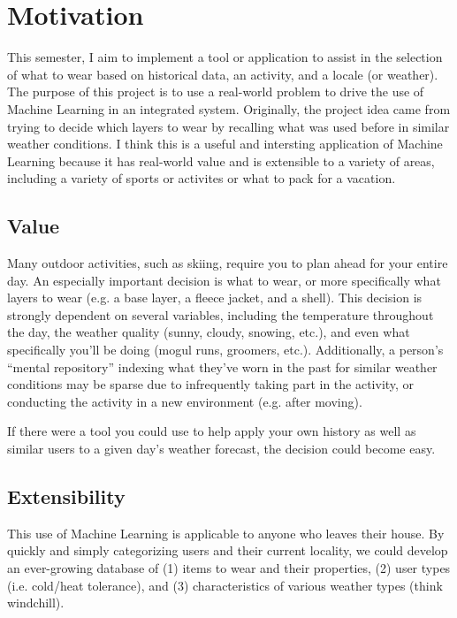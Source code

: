\section{Motivation}
\label{section:motivation}
This semester, I aim to implement a tool or application to assist in the selection of what to wear based on
historical data, an activity, and a locale (or weather). The purpose of this project is to use a real-world
problem to drive the use of Machine Learning in an integrated system. Originally, the project idea came from trying
to decide which layers to wear by recalling what was used before in similar weather conditions. I think this is a
useful and intersting application of Machine Learning because it has real-world value and is extensible to a variety
of areas, including a variety of sports or activites or what to pack for a vacation.

\subsection{Value}
Many outdoor activities, such as skiing, require you to plan ahead for your entire day. An especially important
decision is what to wear, or more specifically what layers to wear (e.g. a base layer, a fleece jacket, and a shell).
This decision is strongly dependent on several variables, including the temperature throughout the day, the weather
quality (sunny, cloudy, snowing, etc.), and even what specifically you'll be doing (mogul runs, groomers, etc.).
Additionally, a person's ``mental repository'' indexing what they've worn in the past for similar weather conditions
may be sparse due to infrequently taking part in the activity, or conducting the activity in a new environment (e.g.
after moving).

If there were a tool you could use to help apply your own history as well as similar users to a given day's weather
forecast, the decision could become easy.

\subsection{Extensibility}
This use of Machine Learning is applicable to anyone who leaves their house. By quickly and simply categorizing
users and their current locality, we could develop an ever-growing database of (1) items to wear and their properties,
(2) user types (i.e. cold/heat tolerance), and (3) characteristics of various weather types (think windchill).

